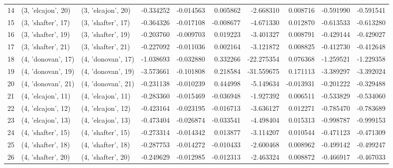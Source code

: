 \begin{tabular}{lllrrrrrrr}
14 &  (3, 'elcajon', 20) &  (3, 'elcajon', 20) & -0.334252 & -0.014563 &  0.005862 &  -2.668310 &  0.008716 & -0.591990 & -0.591541 \\
15 &  (3, 'shafter', 17) &  (3, 'shafter', 17) & -0.364326 & -0.017108 & -0.008677 &  -4.671330 &  0.012870 & -0.613533 & -0.613280 \\
16 &  (3, 'shafter', 19) &  (3, 'shafter', 19) & -0.203760 & -0.009703 &  0.019223 &  -3.401327 &  0.008791 & -0.429144 & -0.429027 \\
17 &  (3, 'shafter', 21) &  (3, 'shafter', 21) & -0.227092 & -0.011036 &  0.002164 &  -3.121872 &  0.008825 & -0.412730 & -0.412648 \\
18 &  (4, 'donovan', 17) &  (4, 'donovan', 17) & -1.038693 & -0.032880 &  0.332266 & -22.275354 &  0.076368 & -1.259521 & -1.229358 \\
19 &  (4, 'donovan', 19) &  (4, 'donovan', 19) & -3.573661 & -0.101808 &  0.218584 & -31.559675 &  0.171113 & -3.389297 & -3.392024 \\
20 &  (4, 'donovan', 21) &  (4, 'donovan', 21) & -0.231138 & -0.010239 &  0.444998 &  -5.149634 & -0.013931 & -0.201222 & -0.329488 \\
21 &  (4, 'elcajon', 11) &  (4, 'elcajon', 11) & -0.283360 & -0.015469 & -0.036948 &  -1.927392 &  0.006511 & -0.533829 & -0.534060 \\
22 &  (4, 'elcajon', 12) &  (4, 'elcajon', 12) & -0.423164 & -0.023195 & -0.016713 &  -3.636127 &  0.012271 & -0.785470 & -0.783689 \\
23 &  (4, 'elcajon', 13) &  (4, 'elcajon', 13) & -0.473404 & -0.026874 & -0.033541 &  -4.498404 &  0.015313 & -0.998787 & -0.999153 \\
24 &  (4, 'shafter', 15) &  (4, 'shafter', 15) & -0.273314 & -0.014342 &  0.013877 &  -3.114207 &  0.010544 & -0.471123 & -0.471309 \\
25 &  (4, 'shafter', 18) &  (4, 'shafter', 18) & -0.287753 & -0.014272 & -0.010433 &  -2.600468 &  0.008962 & -0.499142 & -0.499247 \\
26 &  (4, 'shafter', 20) &  (4, 'shafter', 20) & -0.249629 & -0.012985 & -0.012313 &  -2.463324 &  0.008872 & -0.466917 & -0.467033 \\
\bottomrule
\end{tabular}
